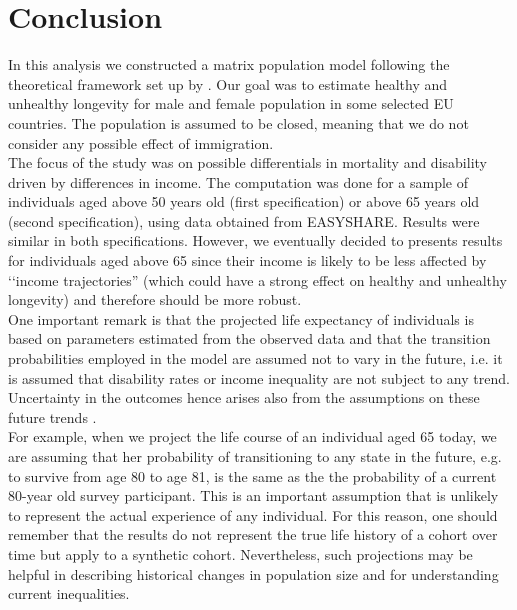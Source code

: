 


\chapter{Conclusion}



In this analysis we constructed a matrix population model following the theoretical framework set up by \cite{Caswell2018}. Our goal was to estimate healthy and unhealthy longevity for male and female population in some selected EU countries. The population is assumed to be closed, meaning that we do not consider any possible effect of immigration.\\

The focus of the study was on possible differentials in mortality and disability driven by differences in income. The computation was done for a sample of individuals aged above 50 years old (first specification) or above 65 years old (second specification), using data obtained from EASYSHARE. Results were similar in both specifications. However, we eventually decided to presents results for individuals aged above 65 since their income is likely to be less affected by \lq\lq income trajectories'' (which could have a strong effect on healthy and unhealthy longevity) and therefore should be more robust.\\

One important remark is that the projected life expectancy of individuals is based on parameters estimated from the observed data and that the transition probabilities employed in the model are assumed not to vary in the future, i.e. it is assumed that disability rates or income inequality are not subject to any trend.
Uncertainty in the outcomes hence arises also from the assumptions on these future trends \citep{ONeill2001AProjections}.\\


For example, when we project the life course of an individual aged 65 today, we are assuming that her probability of transitioning to any state in the future, e.g. to survive from age 80 to age 81, is the same as the the probability of a current 80-year old survey participant. This is an important assumption that is unlikely to represent the actual experience of any individual. 
For this reason, one should remember that the results do not represent the true life history of a cohort over time but apply to a synthetic cohort. Nevertheless, such projections may be helpful in describing historical changes in population size and for understanding current inequalities.\\


